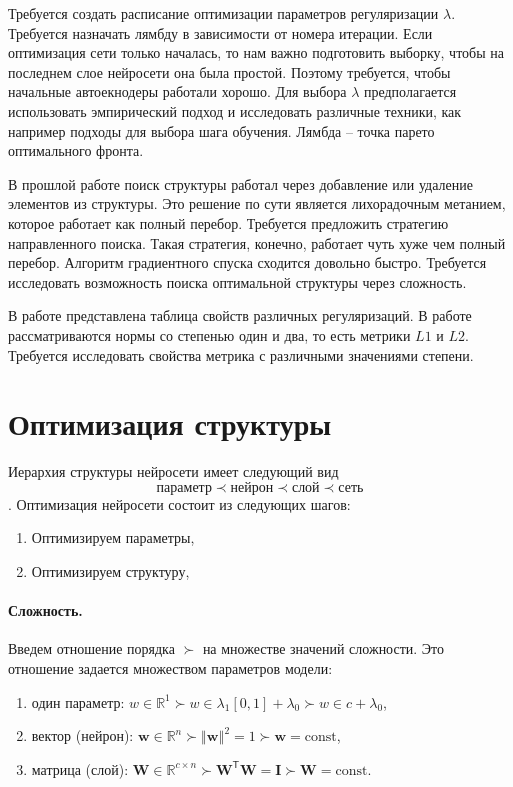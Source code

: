 \documentclass[12pt, twoside]{article}
\newenvironment{comment}{}{}
\newcommand{\wvec}{{\mathbf{W}}}
\newcommand{\wm}{{\mathbf{w}}}
\begin{document}
\begin{comment}
Требуется создать расписание оптимизации параметров регуляризации $\lambda$. Требуется назначать лямбду в зависимости от номера итерации. Если оптимизация сети только началась, то нам важно подготовить выборку, чтобы на последнем слое нейросети она была простой. Поэтому требуется, чтобы начальные автоекнодеры работали хорошо. Для выбора $\lambda$ предполагается использовать эмпирический подход и исследовать различные техники, как например подходы для выбора шага обучения. Лямбда – точка парето оптимального фронта.

В прошлой работе поиск структуры работал через добавление или удаление элементов из структуры. Это решение по сути является лихорадочным метанием, которое работает как полный перебор. Требуется предложить стратегию направленного поиска. Такая стратегия, конечно, работает чуть хуже чем полный перебор. 
Алгоритм градиентного спуска сходится довольно быстро. Требуется исследовать возможность поиска оптимальной структуры через сложность. 




В работе \cite{bib_1} представлена таблица свойств различных регуляризаций. В работе рассматриваются нормы со степенью один и два, то есть метрики $L1$ и $L2$. Требуется исследовать свойства метрика с различными значениями степени. 




\section{Оптимизация структуры}
Иерархия структуры нейросети имеет следующий вид
$$\text{параметр} \prec \text{нейрон} \prec \text{слой} \prec \text{сеть}$$.
Оптимизация нейросети состоит из следующих шагов:
\begin{enumerate}
\item[1)]
Оптимизируем параметры,
\item[2)]
Оптимизируем структуру,
\end{enumerate}

\paragraph{Сложность.}
Введем отношение порядка $\succ$ на множестве значений сложности. Это отношение задается множеством параметров модели:
\begin{enumerate}[1)]
\item один параметр: $w\in \mathbb{R}^1 \succ w \in \lambda_1 [0,1] +\lambda_0 \succ w\in c +\lambda_0$,
\item вектор (нейрон): $\wm\in \mathbb{R}^n \succ \left\Vert \wm \right\Vert^2 =1 \succ \wm= \text{const}$,
\item матрица (слой): $\wvec\in \mathbb{R}^{c{\times}n} \succ \wvec^\mathsf{T}\wvec = \mathbf{I} \succ \wvec= \text{const}$.
\end{enumerate}


\end{comment}
\end{document}
